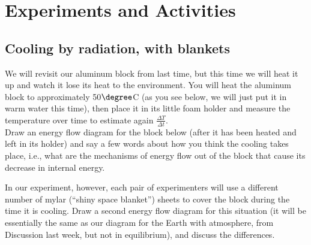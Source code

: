 \newpage

\section{Experiments and Activities}


\subsection{Cooling by radiation, with blankets}

We will revisit our aluminum block from last time, but this time we will heat it up and watch it lose its heat to the environment.  You will heat the aluminum block to approximately 50$\degree$C (as you see below, we will just put it in warm water this time), then place it in its little foam holder and measure the temperature over time to estimate again $\frac{\Delta T}{\Delta t}$.  \\[-6pt]

\noindent Draw an energy flow diagram for the block below (after it has been heated and left in its holder) and say a few words about how you think the cooling takes place, i.e., what are the mechanisms of energy flow out of the block that cause its decrease in internal energy.

\vspace{6cm}

\noindent In our experiment, however, each pair of experimenters will use a different number of mylar (``shiny space blanket'') sheets to cover the block during the time it is cooling.  Draw a second energy flow diagram for this situation (it will be essentially the same as our diagram for the Earth with atmosphere, from Discussion last week, but not in equilibrium), and discuss the differences.

\vspace{6cm}

